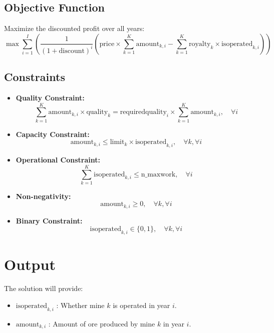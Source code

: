 \documentclass{article}
\begin{document}
\subsection*{Objective Function}
Maximize the discounted profit over all years:
\[
\max \sum_{i=1}^{I} \left( \frac{1}{(1 + \text{discount})^{i}} \left( \text{price} \times \sum_{k=1}^{K} \text{amount}_{k,i} - \sum_{k=1}^{K} \text{royalty}_k \times \text{isoperated}_{k,i} \right) \right)
\]

\subsection*{Constraints}
\begin{itemize}
    \item \textbf{Quality Constraint:}
    \[
    \sum_{k=1}^{K} \text{amount}_{k,i} \times \text{quality}_k = \text{requiredquality}_i \times \sum_{k=1}^{K} \text{amount}_{k,i}, \quad \forall i
    \]

    \item \textbf{Capacity Constraint:}
    \[
    \text{amount}_{k,i} \leq \text{limit}_k \times \text{isoperated}_{k,i}, \quad \forall k, \forall i
    \]

    \item \textbf{Operational Constraint:}
    \[
    \sum_{k=1}^{K} \text{isoperated}_{k,i} \leq \text{n\_maxwork}, \quad \forall i
    \]

    \item \textbf{Non-negativity:}
    \[
    \text{amount}_{k,i} \geq 0, \quad \forall k, \forall i
    \]

    \item \textbf{Binary Constraint:}
    \[
    \text{isoperated}_{k,i} \in \{0, 1\}, \quad \forall k, \forall i
    \]
\end{itemize}

\section*{Output}
The solution will provide:
\begin{itemize}
    \item \(\text{isoperated}_{k,i}\) : Whether mine \( k \) is operated in year \( i \).
    \item \(\text{amount}_{k,i}\) : Amount of ore produced by mine \( k \) in year \( i \).
\end{itemize}
\end{document}
